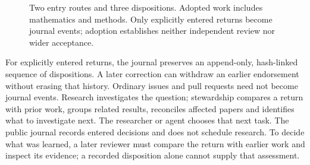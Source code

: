 \documentclass[10pt]{article}
\begin{document}
\begin{figure}[H]\centering
{}
\caption{Two entry routes and three dispositions. Adopted work includes mathematics and methods. Only explicitly entered returns become journal events; adoption establishes neither independent review nor wider acceptance.}
\label{fig:contribute}\end{figure}

For explicitly entered returns, the journal preserves an append-only, hash-linked sequence of dispositions. A later correction can withdraw an earlier endorsement without erasing that history. Ordinary issues and pull requests need not become journal events.
Research investigates the question; stewardship compares a return with prior work, groups related results, reconciles affected papers and identifies what to investigate next.
The researcher or agent chooses that next task. The public journal records entered decisions and does not schedule research.
To decide what was learned, a later reviewer must compare the return with earlier work and inspect its evidence; a recorded disposition alone cannot supply that assessment.
\end{document}
